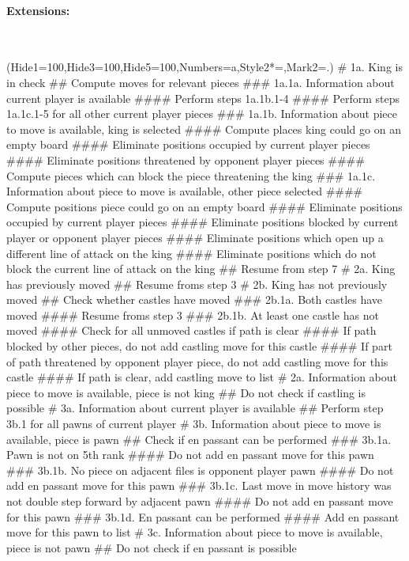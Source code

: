 \documentclass{article}
\begin{document}
\paragraph{Extensions:}\mbox{}\\
\begin{easylist}[enumerate]
\ListProperties(Hide1=100,Hide3=100,Hide5=100,Numbers=a,Style2*=,Mark2=.)
# 1a. King is in check
## Compute moves for relevant pieces
### 1a.1a. Information about current player is available
#### Perform steps 1a.1b.1-4
#### Perform steps 1a.1c.1-5 for all other current player pieces
### 1a.1b. Information about piece to move is available, king is selected
#### Compute places king could go on an empty board
#### Eliminate positions occupied by current player pieces
#### Eliminate positions threatened by opponent player pieces
#### Compute pieces which can block the piece threatening the king
### 1a.1c. Information about piece to move is available, other piece selected
#### Compute positions piece could go on an empty board
#### Eliminate positions occupied by current player pieces
#### Eliminate positions blocked by current player or opponent player pieces
#### Eliminate positions which open up a different line of attack on the king
#### Eliminate positions which do not block the current line of attack on the king
## Resume from step 7
# 2a. King has previously moved
## Resume froms step 3
# 2b. King has not previously moved
## Check whether castles have moved
### 2b.1a. Both castles have moved
#### Resume froms step 3
### 2b.1b. At least one castle has not moved
#### Check for all unmoved castles if path is clear
#### If path blocked by other pieces, do not add castling move for this castle
#### If part of path threatened by opponent player piece, do not add castling move for this castle
#### If path is clear, add castling move to list
# 2a. Information about piece to move is available, piece is not king
## Do not check if castling is possible
# 3a. Information about current player is available
## Perform step 3b.1 for all pawns of current player
# 3b. Information about piece to move is available, piece is pawn
## Check if en passant can be performed
### 3b.1a. Pawn is not on 5th rank
#### Do not add en passant move for this pawn
### 3b.1b. No piece on adjacent files is opponent player pawn
#### Do not add en passant move for this pawn
### 3b.1c. Last move in move history was not double step forward by adjacent pawn
#### Do not add en passant move for this pawn
### 3b.1d. En passant can be performed
#### Add en passant move for this pawn to list
# 3c. Information about piece to move is available, piece is not pawn
## Do not check if en passant is possible
\end{easylist}
\end{document}
